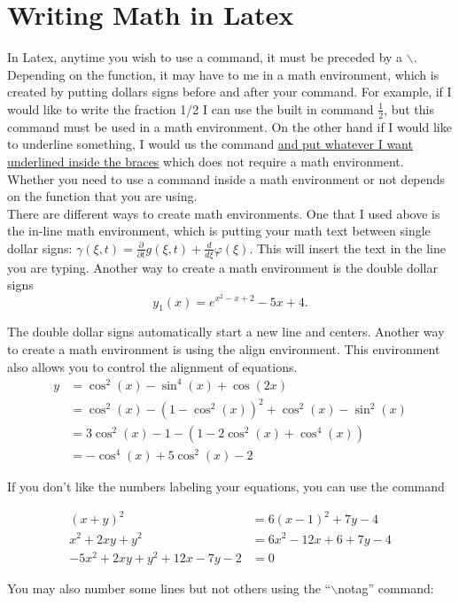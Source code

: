 \documentclass[11pt]{article}
\begin{document}
\section{Writing Math in Latex}

In Latex, anytime you wish to use a command, it must be preceded by a $\backslash$.  Depending on the function, it may have to me in a math environment, which is created by putting dollars signs before and after your command.  For example, if I would like to write the fraction 1/2 I can use the built in command $\frac{1}{2}$, but this command must be used in a math environment.  On the other hand if I would like to underline something, I would us the command \underline{and put whatever I want underlined inside the braces} which does not require a math environment.  Whether you need to use a command inside a math environment or not depends on the function that you are using.\\

There are different ways to create math environments.  One that I used above is the in-line math environment, which is putting your math text between single dollar signs:  $\gamma(\xi,t)=\frac{\partial}{\partial t}g(\xi,t)+\frac{d}{d\xi}\varphi(\xi)$.  This will insert the text in the line you are typing.  Another way to create a math environment is the double dollar signs
$$y_1(x)=e^{x^2-x+2}-5x+4.$$

The double dollar signs automatically start a new line and centers.  Another way to create a math environment is using the align environment.  This environment also allows you to control the alignment of equations.
\begin{align}
y&=\cos^2(x)-\sin^4(x)+\cos(2x)\\
&=\cos^2(x)-(1-\cos^2(x))^2+\cos^2(x)-\sin^2(x)\\
&=3\cos^2(x)-1-(1-2\cos^2(x)+\cos^4(x))\\
&=-\cos^4(x)+5\cos^2(x)-2
\end{align}

If you don't like the numbers labeling your equations, you can use the command

\begin{align*}
(x+y)^2&=6(x-1)^2+7y-4\\
x^2+2xy+y^2&=6x^2-12x+6+7y-4\\
-5x^2+2xy+y^2+12x-7y-2&=0
\end{align*}%

You may also number some lines but not others using the ``$\backslash$notag'' command:
\end{document}
